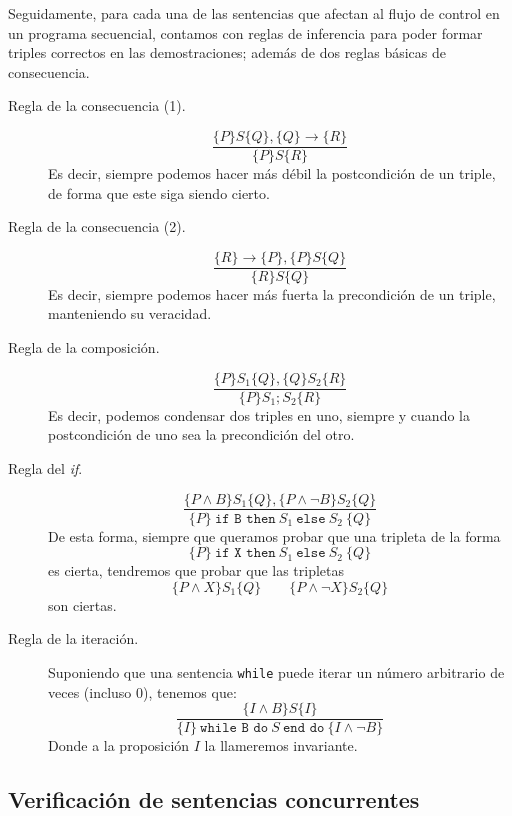 Seguidamente, para cada una de las sentencias que afectan al flujo de control en un programa secuencial, contamos con reglas de inferencia para poder formar triples correctos en las demostraciones; además de dos reglas básicas de consecuencia.

\begin{description}
    \item [Regla de la consecuencia (1).] 
        \begin{equation*}
            \dfrac{\{P\}S\{Q\}, \{Q\}\rightarrow\{R\}}{\{P\}S\{R\}}
        \end{equation*}
        Es decir, siempre podemos hacer más débil la postcondición de un triple, de forma que este siga siendo cierto.
    \item [Regla de la consecuencia (2).] 
        \begin{equation*}
            \dfrac{\{R\}\rightarrow\{P\},\{P\}S\{Q\}}{\{R\}S\{Q\}}
        \end{equation*}
        Es decir, siempre podemos hacer más fuerta la precondición de un triple, manteniendo su veracidad.
    \item [Regla de la composición.] 
        \begin{equation*}
            \dfrac{\{P\}S_1\{Q\}, \{Q\}S_2\{R\}}{\{P\}S_1;S_2\{R\}}
        \end{equation*}
        Es decir, podemos condensar dos triples en uno, siempre y cuando la postcondición de uno sea la precondición del otro.
    \item [Regla del \textit{if}.] 
        \begin{equation*}
            \dfrac{\{P\land B\}S_1\{Q\}, \{P\land \lnot B\}S_2\{Q\}}{\{P\}\ \texttt{if B then}\ S_1\ \texttt{else}\ S_2\ \{Q\}}
        \end{equation*}
        De esta forma, siempre que queramos probar que una tripleta de la forma
        \begin{equation*}
            \{P\}\ \texttt{if X then}\ S_1\ \texttt{else}\ S_2\ \{Q\}
        \end{equation*}
        es cierta, tendremos que probar que las tripletas
        \begin{equation*}
            \{P\land X\}S_1\{Q\}\qquad \{P\land \lnot X\}S_2\{Q\}
        \end{equation*}
        son ciertas.
    \item [Regla de la iteración.] 
        Suponiendo que una sentencia \verb|while| puede iterar un número arbitrario de veces (incluso 0), tenemos que:
        \begin{equation*}
            \dfrac{\{I\land B\}S\{I\}}{\{I\}\ \texttt{while B do}\ S\ \texttt{end do}\ \{I\land \lnot B\}}
        \end{equation*}
        Donde a la proposición $I$ la llameremos invariante.
\end{description}

\subsection{Verificación de sentencias concurrentes}

